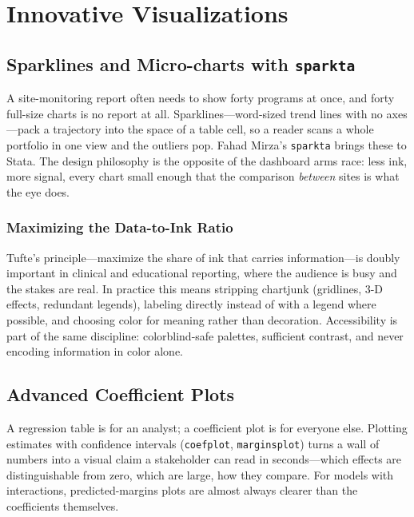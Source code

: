 \documentclass[
    a4paper,
    fontsize=10pt,
    twoside=true,
    numbers=noenddot,
]{kaobook}
\begin{document}


\chapter{Innovative Visualizations}
\section{Sparklines and Micro-charts with \texttt{sparkta}}
A site-monitoring report often needs to show forty programs at once, and forty full-size charts is no report at all. Sparklines---word-sized trend lines with no axes---pack a trajectory into the space of a table cell, so a reader scans a whole portfolio in one view and the outliers pop. Fahad Mirza's \texttt{sparkta} brings these to Stata. The design philosophy is the opposite of the dashboard arms race: less ink, more signal, every chart small enough that the comparison \emph{between} sites is what the eye does.

\subsection{Maximizing the Data-to-Ink Ratio}
Tufte's principle---maximize the share of ink that carries information---is doubly important in clinical and educational reporting, where the audience is busy and the stakes are real. In practice this means stripping chartjunk (gridlines, 3-D effects, redundant legends), labeling directly instead of with a legend where possible, and choosing color for meaning rather than decoration. Accessibility is part of the same discipline: colorblind-safe palettes, sufficient contrast, and never encoding information in color alone.

\section{Advanced Coefficient Plots}
A regression table is for an analyst; a coefficient plot is for everyone else. Plotting estimates with confidence intervals (\texttt{coefplot}, \texttt{marginsplot}) turns a wall of numbers into a visual claim a stakeholder can read in seconds---which effects are distinguishable from zero, which are large, how they compare. For models with interactions, predicted-margins plots are almost always clearer than the coefficients themselves.
\end{document}
